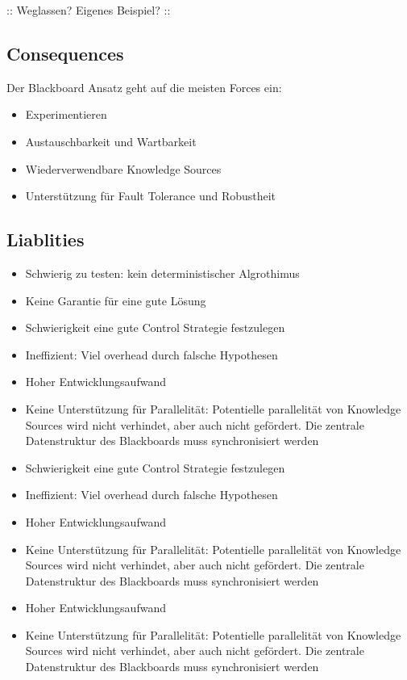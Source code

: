 :: Weglassen? Eigenes Beispiel? ::

\subsection*{Consequences}


Der Blackboard Ansatz geht auf die meisten Forces ein:

\begin{itemize}
	\item Experimentieren
	\item Austauschbarkeit und Wartbarkeit
	\item Wiederverwendbare Knowledge Sources
	\item Unterstützung für Fault Tolerance und Robustheit
\end{itemize}

\subsection*{Liablities}


\begin{itemize}
	\item Schwierig zu testen: kein deterministischer Algrothimus
	\item Keine Garantie für eine gute Lösung
	\item Schwierigkeit eine gute Control Strategie festzulegen
	\item Ineffizient: Viel overhead durch falsche Hypothesen
	\item Hoher Entwicklungsaufwand
	\item Keine Unterstützung für Parallelität: Potentielle parallelität von Knowledge Sources wird nicht verhindet, aber auch nicht gefördert. Die zentrale Datenstruktur des Blackboards muss synchronisiert werden
\end{itemize}

\begin{itemize}
	\item Schwierigkeit eine gute Control Strategie festzulegen
	\item Ineffizient: Viel overhead durch falsche Hypothesen
	\item Hoher Entwicklungsaufwand
	\item Keine Unterstützung für Parallelität: Potentielle parallelität von Knowledge Sources wird nicht verhindet, aber auch nicht gefördert. Die zentrale Datenstruktur des Blackboards muss synchronisiert werden
\end{itemize}

\begin{itemize}
	\item Hoher Entwicklungsaufwand
	\item Keine Unterstützung für Parallelität: Potentielle parallelität von Knowledge Sources wird nicht verhindet, aber auch nicht gefördert. Die zentrale Datenstruktur des Blackboards muss synchronisiert werden
\end{itemize}

